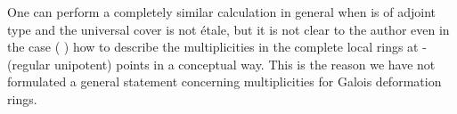 \documentclass[11pt,reqno]{amsart}
\makeatletter
\theoremstyle{definition}
\DeclareMathOperator{\SL}{SL}
\newcounter{mathrecordid}
\newcommand{\mathboxbegin}[1]{%
  \stepcounter{mathrecordid}%
  \immediate\write\mathrecords{\themathrecordid,#1}%
  \special{pdf:bann << /Type /Annot /Subtype /Link /Border [0 0 0]
    /MathBoxID \themathrecordid /F 2
    /A << /S /URI /URI (urn:mathbox:\themathrecordid) >> >>}}
\newcommand{\mathboxinlineplain}[1]{$#1$}
\newcommand{\mathboxinline}[1]{%
  $\mathboxbegin{inline}#1\special{pdf:eann}$}
\newcommand{\recordmath}{%
  \ifmeasuring@\expandafter\mathboxinlineplain
  \else\expandafter\mathboxinline\fi}
\makeatother
\begin{document}
One can perform a completely similar calculation in general when \recordmath{G} is of adjoint type and the universal cover is not \'etale, but it is not clear to the author even in the case \recordmath{G = \SL_2} (\recordmath{\ell = 2}) how to describe the multiplicities in the complete local rings at \recordmath{\Sigma}-(regular unipotent) points in a conceptual way. This is the reason we have not formulated a general statement concerning multiplicities for Galois deformation rings.
































\end{document}
